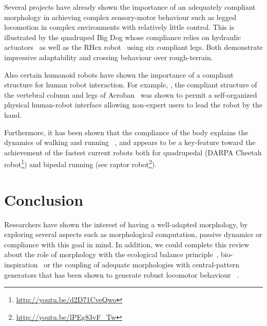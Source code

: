 Several projects have already shown the importance of an adequately compliant morphology in achieving complex sensory-motor behaviour such as legged locomotion in complex environments with relatively little control.  This is illustrated by the quadruped Big Dog whose compliance relies on hydraulic actuators~\parencite{raibert2008bigdog} as well as the RHex robot~\parencite{saranli2001rhex} using six compliant legs. Both demonstrate impressive adaptability and crossing behaviour over rough-terrain.

\begin{figure}[tb]
\centering
    \hfil
    \caption{}
    \label{fig:compliant_robot}
\end{figure}

Also certain humanoid robots have shown the importance of a compliant structure for human robot interaction. For example,  , the compliant structure of the vertebral column and legs of Acroban~\parencite{Ly2011bio} \parencite{Oudeyer2011} was shown to permit a self-organized physical human-robot interface allowing non-expert users to lead the robot by the hand.

Furthermore, it has been shown that the compliance of the body explains the dynamics of walking and running~\parencite{Geyer2006} \parencite{iida2007bipedal}, and appears to be a key-feature toward the achievement of the fastest current robots both for quadrupedal (DARPA Cheetah robot\footnote{\url{http://youtu.be/d2D71CveQwo}}) and bipedal running (see raptor robot\footnote{\url{http://youtu.be/lPEg83vF_Tw}}).



\section{Conclusion} %

Researchers have shown the interest of having a well-adapted morphology, by exploring several aspects such as morphological computation, passive dynamics or compliance with this goal in mind. In addition, we could complete this review about the role of morphology with the ecological balance principle~\parencite{pfeifer2005new}, bio-inspiration~\parencite{scarfogliero2009use} \parencite{pfeifer2007self} or the coupling of adequate morphologies with central-pattern generators that has been shown to generate robust locomotor behaviour~\parencite{ijspeert2007swimming} \parencite{steingrube2010self}.

